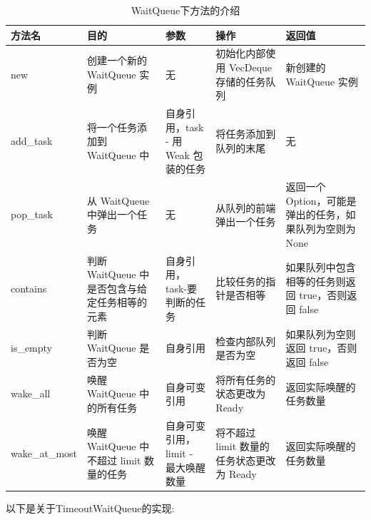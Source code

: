 \begin{table}[H]
    \centering
    \caption{WaitQueue下方法的介绍}
    \begin{tabularx}{17cm}{|X|X|X|X|X|}
        \hline
        方法名 & 目的 & 参数 & 操作 & 返回值 \\
        \hline
        new & 创建一个新的 WaitQueue 实例 & 无 & 初始化内部使用 VecDeque 存储的任务队列 & 新创建的 WaitQueue 实例 \\
        \hline
        add_task & 将一个任务添加到 WaitQueue 中 & 自身引用，task - 用 Weak 包装的任务 & 将任务添加到队列的末尾 & 无 \\
        \hline
        pop_task & 从 WaitQueue 中弹出一个任务 & 无 & 从队列的前端弹出一个任务 & 返回一个 Option，可能是弹出的任务，如果队列为空则为 None \\
        \hline
        contains & 判断 WaitQueue 中是否包含与给定任务相等的元素 & 自身引用，task-要判断的任务 & 比较任务的指针是否相等 & 如果队列中包含相等的任务则返回 true，否则返回 false \\
        \hline
        is_empty & 判断 WaitQueue 是否为空 & 自身引用 & 检查内部队列是否为空 & 如果队列为空则返回 true，否则返回 false \\
        \hline
        wake_all & 唤醒 WaitQueue 中的所有任务 & 自身可变引用 & 将所有任务的状态更改为 Ready & 返回实际唤醒的任务数量 \\
        \hline
        wake_at_most & 唤醒 WaitQueue 中不超过 limit 数量的任务 & 自身可变引用，limit - 最大唤醒数量 & 将不超过 limit 数量的任务状态更改为 Ready & 返回实际唤醒的任务数量 \\
        \hline
    \end{tabularx}
\end{table}

以下是关于TimeoutWaitQueue的实现:

